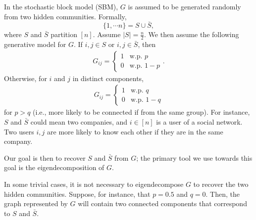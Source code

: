 In the stochastic block model (SBM), $G$ is assumed to be generated randomly from two hidden communities. Formally, 
\begin{equation}
    \{ 1, \cdots n \} = S \cup \bar{S},
\end{equation}
where $S$ and $\bar{S}$ partition $[n]$. Assume $|S| = \frac{n}{2}$. We then assume the following generative model for $G$. 
If $i,j \in S$ or $i,j \in \bar{S}$, then 
\begin{align}
    G_{ij} = \begin{cases}
        1 &\text{w.p. $p$} \\
        0 &\text{w.p. $1-p$} \end{cases}.
\end{align} 
Otherwise, for $i$ and $j$ in distinct components, 
\begin{align}
    G_{ij} = \begin{cases}
        1 &\text{w.p. $q$} \\
        0 &\text{w.p. $1-q$} \end{cases}
\end{align} 
for $p > q$ (i.e., more likely to be connected if from the same group). For instance, $S$ and $\bar{S}$ could mean two companies, and $i\in[n]$ is a user of a social network. Two users $i, j$ are more likely to know each other if they are in the same company.
%


Our goal is then to recover $S$ and $\bar{S}$ from $G$; the primary tool we use towards this goal is the eigendecomposition of $G$.

In some trivial cases, it is not necessary to eigendecompose $G$ to recover the two hidden communities. Suppose, for instance, that $p = 0.5$ and $q = 0$. Then, the graph represented by $G$ will contain two connected components that correspond to $S$ and $\bar{S}$.

